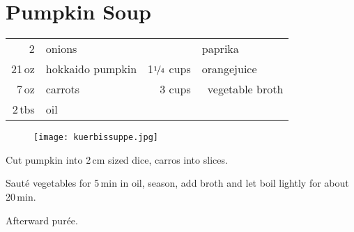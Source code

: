 
\section{Pumpkin Soup}

\begin{table}[H]
\centering
\begin{tabular*}{1\textwidth}{rlrl}
2 & onions && paprika \\
21\,oz & hokkaido pumpkin & 1$\nicefrac{1}{4}$ cups & orangejuice \\
7\,oz & carrots & 3 cups &\ vegetable broth \\
2\,tbs & oil &&\\
\end{tabular*}
\end{table}
\begin{figure}[H]
  \flushright
  \texttt{[image: kuerbissuppe.jpg]}
\end{figure}
\begin{Notes}
\item Cut pumpkin into 2\,cm sized dice, carros into slices.
\item Saut\'{e} vegetables for 5\,min in oil, season, add broth and let boil lightly for about  20\,min.
\item Afterward pur\'{e}e.
\end{Notes}
\vfill
\newpage


